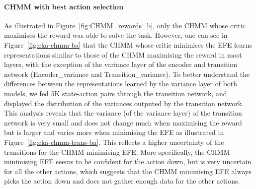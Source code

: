 \documentclass[twoside,11pt]{article}
\begin{document}
\paragraph{CHMM with best action selection}
As illustrated in Figure~\ref{fig:CHMM_rewards_b}, only the CHMM whose critic maximises the reward was able to solve the task. However, one can see in Figure~\ref{fig:cka-chmm-ba} that the CHMM whose critic minimises the EFE learns representations similar to those of the CHMM maximising the reward in most layers, with the exception of the variance layer of the encoder and transition network (Encoder\_variance and Transition\_variance). To better understand the differences between the representations learned by the variance layer of both models, we fed 5K state-action pairs through the transition network, and displayed the distribution of the variances outputed by the transition network. This analysis reveals that the variance (of the variance layer) of the transition network is very small and does not change much when maximising the reward but is larger and varies more when minimising the EFE as illustrated in Figure~\ref{fig:cka-chmm-trans-ba}. This reflects a higher uncertainty of the transitions for the CHMM minimising EFE. More specifically, the CHMM minimising EFE seems to be confident for the action down, but is very uncertain for all the other actions, which suggests that the CHMM minimising EFE always picks the action down and does not gather enough data for the other actions.
\end{document}
